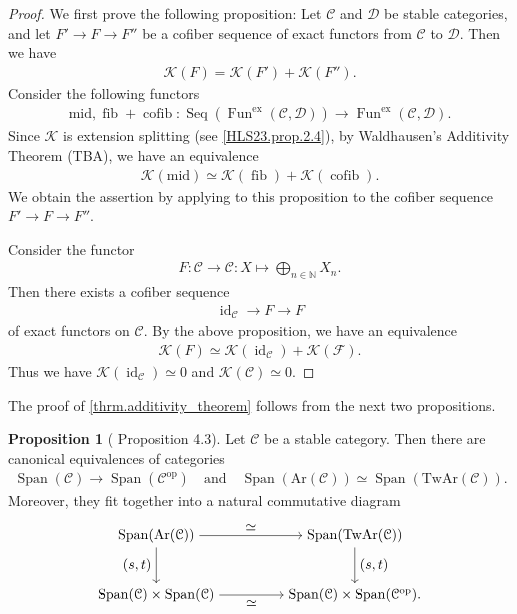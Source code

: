 \documentclass[a4paper,dvipdfmx,11pt,reqno]{amsart}
\DeclareMathOperator{\myop}{op}
\DeclareMathOperator{\id}{id}
\DeclareMathOperator{\fib}{fib}
\DeclareMathOperator{\cofib}{cofib}
\renewcommand{\mid}{\mathrm{mid}}
\DeclareMathOperator{\Fun}{Fun}
\newcommand{\C}{\mathcal{C}}
\newcommand{\D}{\mathcal{D}}
\newcommand{\F}{\mathcal{F}}
\newcommand{\K}{\mathcal{K}}
\DeclareMathOperator{\Seq}{Seq}
\DeclareMathOperator{\Span}{Span}
\newcommand{\Ar}{\mathrm{Ar}}
\newcommand{\TwAr}{\mathrm{TwAr}}
\theoremstyle{definition}
\newtheorem{proposition}[theorem]{Proposition}
\begin{document}
\begin{proof}
  We first prove the following proposition:
  Let $\C$ and $\D$ be stable categories, and let $F' \to F \to F''$ be a cofiber sequence of exact functors from $\C$ to $\D$.
  Then we have 
  \begin{align*}
    \K(F) = \K(F') + \K(F'').
  \end{align*}
  Consider the following functors 
  \begin{align*}
    \mid, \fib+\cofib : \Seq(\Fun^{\mathrm{ex}}(\C,\D)) \to \Fun^{\mathrm{ex}}(\C,\D).
  \end{align*}
  Since $\K$ is extension splitting (see \cref{HLS23.prop.2.4}), by Waldhausen's Additivity Theorem (TBA), we have an equivalence %
  \begin{align*}
    \K(\mid) \simeq \K(\fib) + \K(\cofib).
  \end{align*}
  We obtain the assertion by applying to this proposition to the cofiber sequence $F' \to F \to F''$.

  Consider the functor
  \begin{align*}
    F : \C \to \C : X \mapsto \bigoplus_{n \in \mathbb{N}} X_n .
  \end{align*}
  Then there exists a cofiber sequence 
  \begin{align*}
    \id_{\C} \to F \to F
  \end{align*}
  of exact functors on $\C$.
  By the above proposition, we have an equivalence 
  \begin{align*}
    \K(F) \simeq \K(\id_{\C}) + \K(\F). 
  \end{align*}
  Thus we have $\K(\id_{\C}) \simeq 0$ and $\K(\C) \simeq 0$.
\end{proof}

The proof of \cref{thrm.additivity_theorem} follows from the next two propositions.

\begin{proposition}[\cite{HLS23} Proposition 4.3] \label{HLS23.prop.4.3}
  Let $\C$ be a stable category.
  Then there are canonical equivalences of categories
  \begin{align*}
    \Span(\C) \to \Span(\C^{\myop}) \quad \text{and} \quad \Span(\Ar(\C)) \simeq \Span(\TwAr(\C)).
  \end{align*}
  Moreover, they fit together into a natural commutative diagram 
  \[\begin{tikzpicture}[auto,->] 
    \node (tl) at (0,1.5) {$\Span(\Ar(\C))$}; 
    \node (tr) at (5,1.5) {$\Span(\TwAr(\C))$};
    \node (bl) at (0,0) {$\Span(\C) \times \Span(\C)$}; 
    \node (br) at (5,0) {$\Span(\C) \times \Span(\C^{\myop}).$}; 
    \draw (tl) -- node {$\simeq$} (tr); 
    \draw (bl) -- node[swap] {$\simeq$} (br); 
    \draw (tl) -- node[swap] {$(s,t)$} (bl);
    \draw (tr) -- node {$(s,t)$} (br); 
  \end{tikzpicture}\]
\end{proposition}
\end{document}

